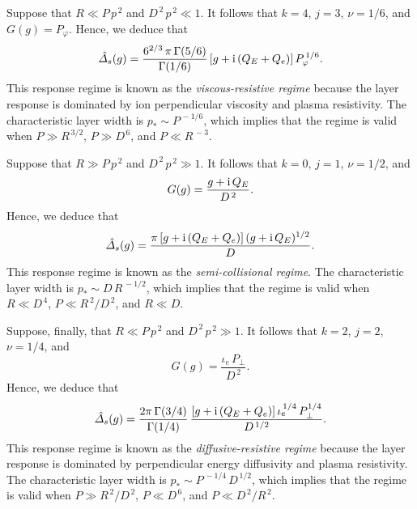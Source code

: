 \documentclass[titlepage=false,12pt]{article}
\begin{document}
Suppose that $R\ll P\,p^{\,2}$ and $D^{\,2}\,p^{\,2}\ll 1$. It follows that $k=4$, $j=3$, $\nu=1/6$, and $G(g)=P_\varphi$. 
Hence, we deduce that
\begin{equation}\label{vr}
\hat{\mit\Delta}_s(g) = \frac{6^{2/3}\,\pi\,\Gamma(5/6)}{\Gamma(1/6)}\, [g+{\rm i}\,(Q_E+Q_e)]\,P_\varphi^{\,1/6}.
\end{equation}
This response regime is known as the {\em viscous-resistive regime}\/ because the layer response is dominated by
  ion perpendicular viscosity and plasma resistivity. The characteristic layer width is $p_\ast \sim P^{\,-1/6}$, which implies that
the regime is valid when  $P\gg R^{\,3/2}$, $P\gg D^{\,6}$, and $P\ll R^{\,-3}$. 

Suppose that $R\gg P\,p^{\,2}$ and $D^{\,2}\,p^{\,2}\gg 1$. It follows that $k=0$, $j=1$, $\nu=1/2$, and
\begin{equation}
G(g) = \frac{g+ {\rm i}\,Q_E}{D^{\,2}}.
\end{equation}
Hence, we deduce that
\begin{equation}\label{sc}
\hat{\mit\Delta}_s(g)= \frac{\pi\,[g+{\rm i}\,(Q_E+Q_e)]\,(g+{\rm i}\,Q_E)^{1/2}}{D}.
\end{equation}
This response regime is known as the {\em semi-collisional regime}. The characteristic
layer width is $p_\ast\sim D\,R^{\,-1/2}$, which implies that the regime is valid when $R\ll D^{\,4}$,
 $P\ll R^{\,2}/D^{\,2}$, and $R\ll D$. 
 
Suppose, finally, that $R\ll P\,p^{\,2}$ and $D^{\,2}\,p^{\,2}\gg 1$. It follows that $k=2$, $j=2$, $\nu=1/4$, and
\begin{equation}
G(g) = \frac{\iota_e\,P_\perp}{D^{\,2}}.
\end{equation}
Hence, we deduce that 
\begin{equation}\label{dr}
\hat{\mit\Delta}_s(g)= \frac{2\pi\,\Gamma(3/4)}{\Gamma(1/4)}\,\frac{[g+{\rm i}\,(Q_E+Q_e)]\,\iota_e^{\,1/4}\,P_\perp^{1/4}}{D^{\,1/2}}.
\end{equation}
This response regime is known as the {\em diffusive-resistive regime}\/ because the layer 
response is dominated by perpendicular energy diffusivity and plasma resistivity. The characteristic
layer width is $p_\ast \sim P^{\,-1/4}\,D^{\,1/2}$, which implies that the regime is valid when $P\gg R^{\,2}/D^{\,2}$,
$P\ll D^{\,6}$, and $P\ll D^{\,2}/R^{\,2}$. 
\end{document}
